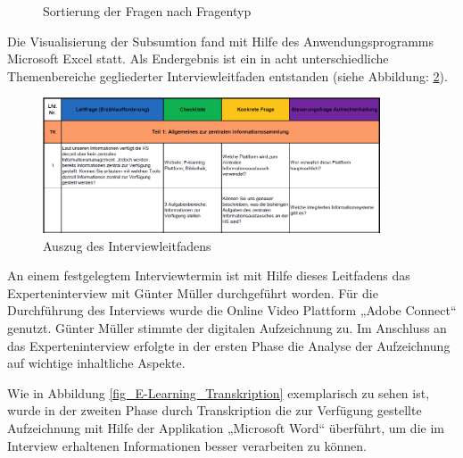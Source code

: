 \begin{figure}[h!]
	\centering
	\caption{Sortierung der Fragen nach Fragentyp}
	\label{fig_sortierung_fragentyp}
\end{figure}

Die Visualisierung der Subsumtion fand mit Hilfe des Anwendungsprogramms Microsoft Excel statt. Als Endergebnis ist ein in acht unterschiedliche Themenbereiche gegliederter Interviewleitfaden entstanden (siehe Abbildung: \ref{fig_auszug_interviewleitfaden}).

\begin{figure}[h!]
	\centering
	\includegraphics[width=10cm]{kapitel/gruppe2/bilder/auszug_leitfaden}
	\caption{Auszug des Interviewleitfadens}
	\label{fig_auszug_interviewleitfaden}
\end{figure}

An einem festgelegtem Interviewtermin ist mit Hilfe dieses Leitfadens das Experteninterview mit Günter Müller durchgeführt worden. Für die Durchführung des Interviews wurde die Online Video Plattform „Adobe Connect“ genutzt. Günter Müller stimmte der digitalen Aufzeichnung zu. Im Anschluss an das Experteninterview erfolgte in der ersten Phase die Analyse der Aufzeichnung auf wichtige inhaltliche Aspekte.

Wie in Abbildung \ref{fig_E-Learning_Transkription} exemplarisch zu sehen ist, wurde in der zweiten Phase durch Transkription die zur Verfügung gestellte Aufzeichnung mit Hilfe der Applikation „Microsoft Word“ überführt, um die im Interview erhaltenen Informationen besser verarbeiten zu können.


